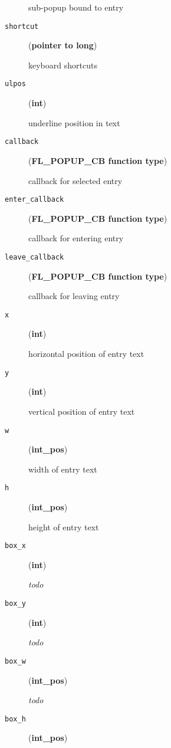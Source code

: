 \begin{description}
sub-popup bound to entry

\item[{\texttt{shortcut}}] \leavevmode (\textbf{pointer to long})

keyboard shortcuts

\item[{\texttt{ulpos}}] \leavevmode (\textbf{int})

underline position in text

\item[{\texttt{callback}}] \leavevmode (\textbf{FL\_POPUP\_CB function type})

callback for selected entry

\item[{\texttt{enter\_callback}}] \leavevmode (\textbf{FL\_POPUP\_CB function type})

callback for entering entry

\item[{\texttt{leave\_callback}}] \leavevmode (\textbf{FL\_POPUP\_CB function type})

callback for leaving entry

\item[{\texttt{x}}] \leavevmode (\textbf{int})

horizontal position of entry text

\item[{\texttt{y}}] \leavevmode (\textbf{int})

vertical position of entry text

\item[{\texttt{w}}] \leavevmode (\textbf{int\_pos})

width of entry text

\item[{\texttt{h}}] \leavevmode (\textbf{int\_pos})

height of entry text

\item[{\texttt{box\_x}}] \leavevmode (\textbf{int})

\emph{todo}

\item[{\texttt{box\_y}}] \leavevmode (\textbf{int})

\emph{todo}

\item[{\texttt{box\_w}}] \leavevmode (\textbf{int\_pos})

\emph{todo}

\item[{\texttt{box\_h}}] \leavevmode (\textbf{int\_pos})


\end{description}
